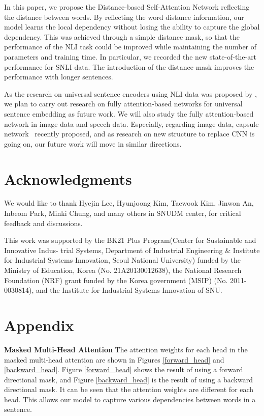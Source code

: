 \documentclass[11pt,letterpaper]{article}
\begin{document}
In this paper, we propose the Distance-based Self-Attention Network reflecting the distance between words. By reflecting the word distance information, our model learns the local dependency without losing the ability to capture the global dependency. This was achieved through a simple distance mask, so that the performance of the NLI task could be improved while maintaining the number of parameters and training time. In particular, we recorded the new state-of-the-art performance for SNLI data. The introduction of the distance mask improves the performance with longer sentences.

As the research on universal sentence encoders using NLI data was proposed by \citet{Facebook}, we plan to carry out research on fully attention-based networks for universal sentence embedding as future work. We will also study the fully attention-based network in image data and speech data. Especially, regarding image data, capsule network~\citep{Capsule} recently proposed, and as research on new structure to replace CNN is going on, our future work will move in similar directions.



\section*{Acknowledgments}

We would like to thank Hyejin Lee, Hyunjoong Kim, Taewook Kim, Jinwon An, Inbeom Park, Minki Chung, and many others in
SNUDM center, for critical feedback and discussions.

This work was supported by the BK21 Plus Program(Center for Sustainable and Innovative Indus- trial Systems, Department of Industrial Engineering \& Institute for Industrial Systems Innovation, Seoul National University) funded by the Ministry of Education, Korea (No. 21A20130012638), the National Research Foundation (NRF) grant funded by the Korea government (MSIP) (No. 2011- 0030814), and the Institute for Industrial Systems Innovation of SNU.




\newpage

\section*{Appendix}
\label{appendix}

\textbf{Masked Multi-Head Attention} The attention weights for each head in the masked multi-head attention are shown in Figures \ref{forward_head} and \ref{backward_head}. Figure \ref{forward_head} shows the result of using a forward directional mask, and Figure \ref{backward_head} is the result of using a backward directional mask. It can be seen that the attention weights are different for each head. This allows our model to capture various dependencies between words in a sentence.
\end{document}

